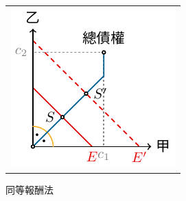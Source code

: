 \begin{center}
	\hfill
	\begin{tabular}{l}
		\includegraphics{divide/divide-equal_reward.pdf}
	\end{tabular}
	\hfill\textsf{同等報酬法}
\end{center}
